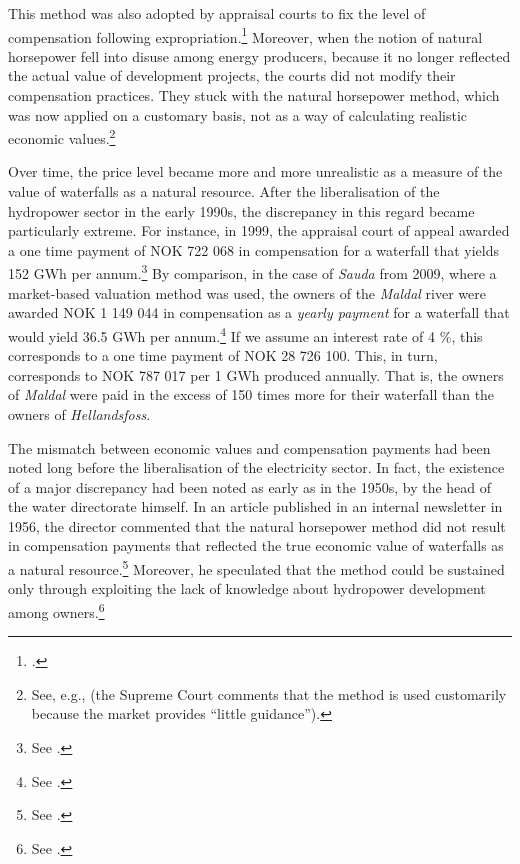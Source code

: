 This method was also adopted by appraisal courts to fix the level of compensation following expropriation.\footnote{\cite[521]{vislie02}.} Moreover, when the notion of natural horsepower fell into disuse among energy producers, because it no longer reflected the actual value of development projects, the courts did not modify their compensation practices. They stuck with the natural horsepower method, which was now applied on a customary basis, not as a way of calculating realistic economic values.\footnote{See, e.g., \cite[1599]{hellandsfoss99} (the Supreme Court comments that the method is used customarily because the market provides ``little guidance'').} %

Over time, the price level became more and more unrealistic as a measure of the value of waterfalls as a natural resource. After the liberalisation of the hydropower sector in the early 1990s, the discrepancy in this regard became particularly extreme. For instance, in 1999, the appraisal court of appeal awarded a one time payment of NOK 722 068 in compensation for a waterfall that yields 152 GWh per annum.\footnote{See \cite{hellandsfoss99}.} By comparison, in the case of {\it Sauda} from 2009, where a market-based valuation method was used, the owners of the {\it Maldal} river were awarded NOK 1 149 044 in compensation as a {\it yearly payment} for a waterfall that would yield 36.5 GWh per annum.\footnote{See \cite{sauda09}.} If we assume an interest rate of 4 \%, this corresponds to a one time payment of NOK 28 726 100. This, in turn, corresponds to NOK 787 017 per 1 GWh produced annually. That is, the owners of {\it Maldal} were paid in the excess of 150 times more for their waterfall than the owners of {\it Hellandsfoss}.

The mismatch between economic values and compensation payments had been noted long before the liberalisation of the electricity sector. In fact, the existence of a major discrepancy had been noted as early as in the 1950s, by the head of the water directorate himself. In an article published in an internal newsletter in 1956, the director commented that the natural horsepower method did not result in compensation payments that reflected the true economic value of waterfalls as a natural resource.\footnote{See \cite{rogstad56}.} Moreover, he speculated that the method could be sustained only through exploiting the lack of knowledge about hydropower development among owners.\footnote{See \cite{rogstad56}.}

